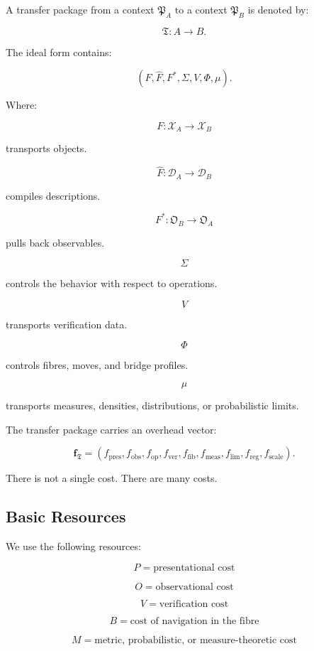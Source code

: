 \documentclass[11pt]{article}
\begin{document}
A transfer package from a context \(\mathfrak P_A\) to a context \(\mathfrak P_B\) is denoted by:

\[
\mathfrak T:A\longrightarrow B.
\]

The ideal form contains:

\[
(F,\widehat F,F^\ast,\Sigma,V,\Phi,\mu).
\]

Where:

\[
F:\mathcal X_A\to\mathcal X_B
\]

transports objects.

\[
\widehat F:\mathcal D_A\to\mathcal D_B
\]

compiles descriptions.

\[
F^\ast:\mathfrak O_B\to\mathfrak O_A
\]

pulls back observables.

\[
\Sigma
\]

controls the behavior with respect to operations.

\[
V
\]

transports verification data.

\[
\Phi
\]

controls fibres, moves, and bridge profiles.

\[
\mu
\]

transports measures, densities, distributions, or probabilistic limits.

The transfer package carries an overhead vector:

\[
\mathbf f_{\mathfrak T}=
(f_{\mathrm{pres}},
f_{\mathrm{obs}},
f_{\mathrm{op}},
f_{\mathrm{ver}},
f_{\mathrm{fib}},
f_{\mathrm{meas}},
f_{\mathrm{lim}},
f_{\mathrm{reg}},
f_{\mathrm{scale}}).
\]

There is not a single cost. There are many costs.



\subsection{Basic Resources}

We use the following resources:

\[
P=\text{presentational cost}
\]

\[
O=\text{observational cost}
\]

\[
V=\text{verification cost}
\]

\[
B=\text{cost of navigation in the fibre}
\]

\[
M=\text{metric, probabilistic, or measure-theoretic cost}
\]
\end{document}

